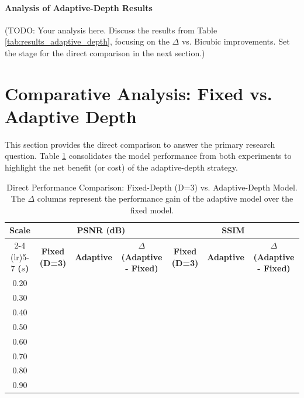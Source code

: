 \paragraph{Analysis of Adaptive-Depth Results}
(TODO: Your analysis here. Discuss the results from Table \ref{tab:results_adaptive_depth}, focusing on the $\Delta$ vs. Bicubic improvements. Set the stage for the direct comparison in the next section.)

\section{Comparative Analysis: Fixed vs. Adaptive Depth}
\label{sec:results_comparison}

This section provides the direct comparison to answer the primary research question. Table \ref{tab:results_comparison} consolidates the model performance from both experiments to highlight the net benefit (or cost) of the adaptive-depth strategy.

\begin{table}[h!]
    \centering
    \caption{Direct Performance Comparison: Fixed-Depth (D=3) vs. Adaptive-Depth Model. The $\Delta$ columns represent the performance gain of the adaptive model over the fixed model.}
    \label{tab:results_comparison}
    \begin{tabular}{c | c c c | c c c}
        \toprule
        \textbf{Scale} & \multicolumn{3}{c}{\textbf{PSNR (dB)}} & \multicolumn{3}{c}{\textbf{SSIM}} \\
        \cmidrule(lr){2-4} \cmidrule(lr){5-7}
        \textbf{($s$)} & \textbf{Fixed (D=3)} & \textbf{Adaptive} & \textbf{$\Delta$ (Adaptive - Fixed)} & \textbf{Fixed (D=3)} & \textbf{Adaptive} & \textbf{$\Delta$ (Adaptive - Fixed)} \\
        \midrule
        0.20 & & & & & & \\
        0.30 & & & & & & \\
        0.40 & & & & & & \\
        0.50 & & & & & & \\
        0.60 & & & & & & \\
        0.70 & & & & & & \\
        0.80 & & & & & & \\
        0.90 & & & & & & \\
        \bottomrule
    \end{tabular}
\end{table}

